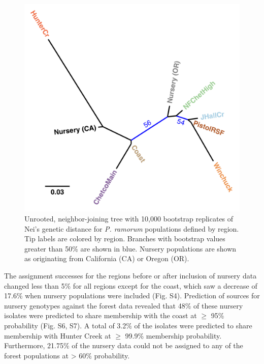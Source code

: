 \documentclass[double,12pt]{beavtex}
\begin{document}
  \begin{figure}
  
  {\centering \includegraphics[width=0.8\linewidth]{figure/phytopathology/figure_5} 
  
  }
  
  \caption[Unrooted, neighbor-joining tree with 10,000 bootstrap replicates of
  Nei's genetic distance for \emph{P. ramorum} populations defined by
  region.]{Unrooted, neighbor-joining tree with 10,000 bootstrap replicates of
  Nei's genetic distance for \emph{P. ramorum} populations defined by
  region. Tip labels are colored by region. Branches with bootstrap values
  greater than 50\% are shown in blue. Nursery populations are shown as
  originating from California (CA) or Oregon (OR).}\label{fig:ramorum5}
  \end{figure}
  
  \newpage
  
  The assignment successes for the regions before or after inclusion of
  nursery data changed less than 5\% for all regions except for the coast,
  which saw a decrease of 17.6\% when nursery populations were included
  (Fig. S4). Prediction of sources for nursery genotypes against the
  forest data revealed that 48\% of these nursery isolates were predicted
  to share membership with the coast at \(\geq\) 95\% probability (Fig.
  S6, S7). A total of 3.2\% of the isolates were predicted to share
  membership with Hunter Creek at \(\geq\) 99.9\% membership probability.
  Furthermore, 21.75\% of the nursery data could not be assigned to any of
  the forest populations at \textgreater{} 60\% probability.
  
\end{document}
